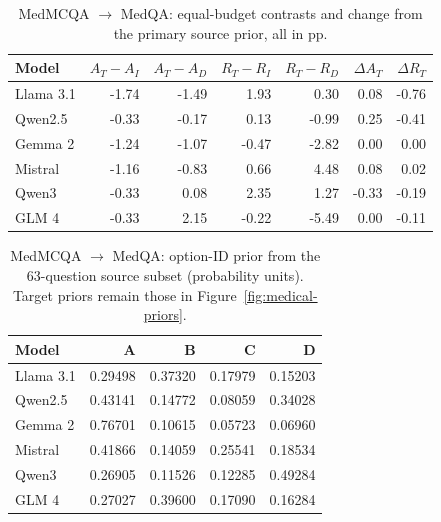 \begin{table}[H]
\centering\small\setlength{\tabcolsep}{5pt}
\caption{MedMCQA $\to$ MedQA: equal-budget contrasts and change from the primary source prior, all in pp.}\label{tab:eq-contrasts-medmcqa}
\begin{tabular}{lrrrrrr}
\toprule
Model & $A_T-A_I$ & $A_T-A_D$ & $R_T-R_I$ & $R_T-R_D$ & $\Delta A_T$ & $\Delta R_T$\\
\midrule
Llama 3.1 & -1.74 & -1.49 & 1.93 & 0.30 & 0.08 & -0.76\\
Qwen2.5 & -0.33 & -0.17 & 0.13 & -0.99 & 0.25 & -0.41\\
Gemma 2 & -1.24 & -1.07 & -0.47 & -2.82 & 0.00 & 0.00\\
Mistral & -1.16 & -0.83 & 0.66 & 4.48 & 0.08 & 0.02\\
Qwen3 & -0.33 & 0.08 & 2.35 & 1.27 & -0.33 & -0.19\\
GLM 4 & -0.33 & 2.15 & -0.22 & -5.49 & 0.00 & -0.11\\
\bottomrule
\end{tabular}
\end{table}


\begin{table}[H]
\centering\small\setlength{\tabcolsep}{5pt}
\caption{MedMCQA $\to$ MedQA: option-ID prior from the 63-question source subset (probability units). Target priors remain those in Figure~\ref{fig:medical-priors}.}\label{tab:eq-prior-medmcqa}
\begin{tabular}{lrrrr}
\toprule
Model & A & B & C & D\\
\midrule
Llama 3.1 & 0.29498 & 0.37320 & 0.17979 & 0.15203\\
Qwen2.5 & 0.43141 & 0.14772 & 0.08059 & 0.34028\\
Gemma 2 & 0.76701 & 0.10615 & 0.05723 & 0.06960\\
Mistral & 0.41866 & 0.14059 & 0.25541 & 0.18534\\
Qwen3 & 0.26905 & 0.11526 & 0.12285 & 0.49284\\
GLM 4 & 0.27027 & 0.39600 & 0.17090 & 0.16284\\
\bottomrule
\end{tabular}
\end{table}


